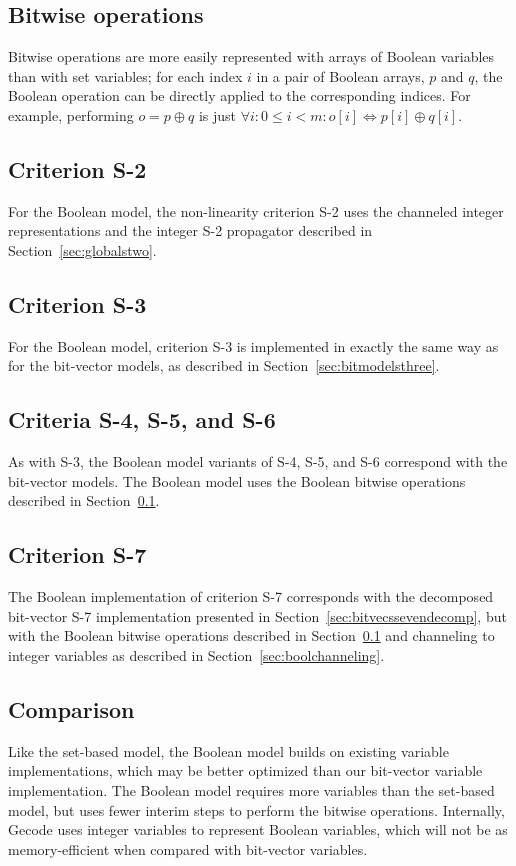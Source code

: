 \documentclass[a4paper,10pt,twoside,openright]{book}
\begin{document}
\subsection{Bitwise operations}
\label{sec:boolbitwise}
Bitwise operations are more easily represented with arrays of Boolean variables than with set variables; 
for each index $i$ in a pair of Boolean arrays, $p$ and $q$,
the Boolean operation can be directly applied to the corresponding indices.
For example, performing $o = p \oplus q$ is just $\forall i : 0 \leq i < m : o[i] \Leftrightarrow p[i] \oplus q[i]$.

\subsection{Criterion S-2}
For the Boolean model, the non-linearity criterion S-2 uses the channeled integer representations 
and the integer S-2 propagator described in Section~\ref{sec:globalstwo}.

\subsection{Criterion S-3}
For the Boolean model, criterion S-3 is implemented in exactly the same way as for the 
bit-vector models, as described in Section~\ref{sec:bitmodelsthree}.

\subsection{Criteria S-4, S-5, and S-6}
As with S-3, the Boolean model variants of S-4, S-5, and S-6 correspond with the bit-vector models. 
The Boolean model uses the Boolean bitwise operations described in Section~\ref{sec:boolbitwise}.

\subsection{Criterion S-7}
The Boolean implementation of criterion S-7 corresponds with the decomposed bit-vector S-7
implementation presented in Section~\ref{sec:bitvecssevendecomp}, but with
the Boolean bitwise operations described in
Section~\ref{sec:boolbitwise} and channeling to integer variables as 
described in Section~\ref{sec:boolchanneling}.

\subsection{Comparison}
Like the set-based model, the Boolean model builds on existing variable implementations,
which may be better optimized than our bit-vector variable implementation.
The Boolean model requires more variables than the set-based model, 
but uses fewer interim steps to perform the bitwise operations.
Internally, Gecode uses integer variables to represent Boolean variables,
which will not be as memory-efficient when compared with bit-vector variables.
\end{document}
